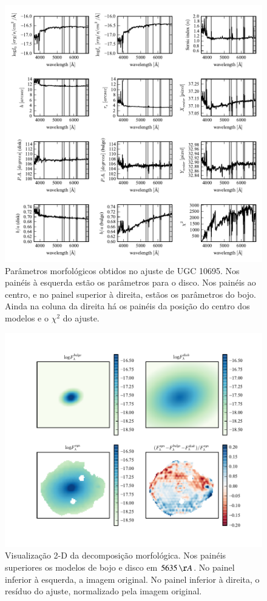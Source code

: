 \begin{figure}
	\includegraphics{figuras/decomp-fit-parameters}
	\caption[Parâmetros morfológicos] {Parâmetros morfológicos obtidos no ajuste
	de UGC 10695. Nos painéis à esquerda estão os parâmetros para o disco. Nos
	painéis ao centro, e no painel superior à direita, estãos os parâmetros do
	bojo. Ainda na coluna da direita há os painéis da posição do centro dos
	modelos e o $\chi^2$ do ajuste.}
	\label{fig:decompParams}
\end{figure}

\begin{figure}
	\includegraphics{figuras/decomp-model-images}
	\caption[Visualização 2-D da decomposição morfológica] {Visualização 2-D da
	decomposição morfológica. Nos painéis superiores os modelos de bojo e disco em
	$5635\,\AA$. No painel inferior à esquerda, a imagem original. No painel
	inferior à direita, o resíduo do ajuste, normalizado pela imagem original.}
	\label{fig:decompImages}
\end{figure}

